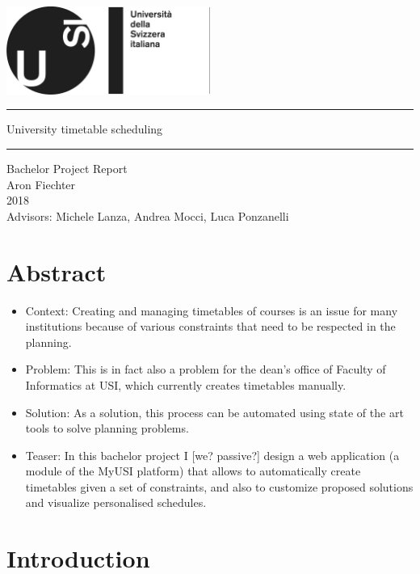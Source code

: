 \documentclass[12pt, a4paper, english]{report}
\begin{document}
\begin{titlepage}
\begin{center}
~\\[2cm]
\includegraphics[width=0.5\textwidth]{logo}\\[3.5cm]
\hrule height 1pt
\vspace{5mm}
{\Huge University timetable scheduling}
\vspace{3mm}
\hrule height 1pt
\vspace{1cm}
{\Large Bachelor Project Report}\\[3mm]
{\Large Aron Fiechter}\\[3mm]
{\Large 2018}\\[3.5cm]
{\large Advisors: Michele Lanza, Andrea Mocci, Luca Ponzanelli}
\end{center}
\end{titlepage}

\section*{Abstract}
\begin{itemize}[label=\(\triangleright\)]
\item Context: Creating and managing timetables of courses is an issue for many institutions because of various constraints that need to be respected in the planning. 
\item Problem: This is in fact also a problem for the dean's office of Faculty of Informatics at USI, which currently creates timetables manually.
\item Solution: As a solution, this process can be automated using state of the art tools to solve planning problems.
\item Teaser: In this bachelor project I [we? passive?] design a web application (a module of the MyUSI platform) that allows to automatically create timetables given a set of constraints, and also to customize proposed solutions and visualize personalised schedules.
\end{itemize}
\section{Introduction}
\end{document}
